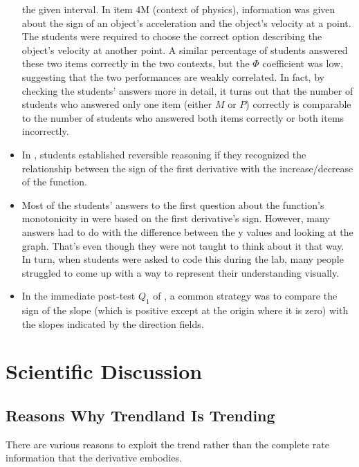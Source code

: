\documentclass[11pt]{book}
\begin{document}
\begin{itemize}
the given interval. In item 4M (context of physics), information was
given about the sign of an object's acceleration and the object's
velocity at a point. The students were required to choose the correct
option describing the object's velocity at another point. A similar
percentage of students answered these two items correctly in the two
contexts, but the $\Phi$ coefficient was low, suggesting that the
two performances are weakly correlated. In fact, by checking the students'
answers more in detail, it turns out that the number of students who
answered only one item (either $M$ or $P$) correctly is comparable
to the number of students who answered both items correctly or both
items incorrectly.
\item In \cite{ikram2020mathematical},
students established reversible reasoning if they recognized the relationship
between the sign of the first derivative with the increase/decrease
of the function.
\item Most of the students' answers to the first question about the function's
monotonicity in \cite{ishibashi2020effect}
were based on the first derivative's sign. However, many answers had
to do with \textquotedbl the difference between the y values\textquotedbl{}
and \textquotedbl looking at the graph.\textquotedbl{} That's even
though they were not taught to think about it that way. In turn, when
students were asked to code this during the lab, many people struggled
to come up with a way to represent their understanding visually.
\item In the immediate post-test $Q_{1}$ of \cite{hyland2021introducing},
a common strategy was to compare the sign of the slope (which is positive
except at the origin where it is zero) with the slopes indicated by
the direction fields.\newpage{}
\end{itemize}

\part{Scientific Discussion}
\label{scientific_discussion_part}
\chapter{Reasons Why Trendland Is Trending}

There are various reasons to exploit the trend rather than the complete
rate information that the derivative embodies.
\end{document}
